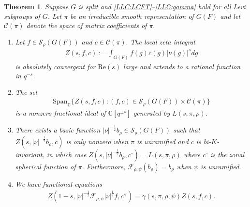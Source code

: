 \documentclass[10pt]{amsart}
\newtheorem{theorem}{Theorem}[section]
\theoremstyle{definition}
\numberwithin{equation}{section}
\numberwithin{equation}{subsection}
\begin{document}
\begin{theorem}\label{BKN:conj} Suppose $G$ is split and \eqref{LLC:LCFT}--\eqref{LLC:gamma} hold for all Levi subgroups of $G$. Let $\pi$ be an irreducible smooth representation of $G(F)$ and let $\mathcal{C}(\pi)$ denote the space of matrix coefficients of $\pi.$
\begin{enumerate}
    \item\label{BKN:zeta} Let $f\in\mathcal{S}_\rho(G(F))$ and $c\in\mathcal{C}(\pi).$ The local zeta integral
    \begin{align*}
        Z(s,f,c) := \int_{G(F)} f(g)c(g)|\nu(g)|^s dg
    \end{align*}
    is absolutely convergent for $\mathrm{Re}(s)$ large and extends to a rational function in $q^{-s}$.
    \item\label{BKN:span:L} The set
    \begin{align*}
        \mathrm{Span}_{\mathbb{C}}\{Z(s,f,c):(f,c)\in\mathcal{S}_\rho(G(F))\times\mathcal{C}(\pi)\}
    \end{align*}
    is a nonzero fractional ideal of $\mathbb{C}[q^{\pm s}]$ generated by $L(s,\pi,\rho)$.
    \item\label{BKN:basic} There exists a basic function $|\nu|^{-\frac{1}{2}}b_\rho\in\mathcal{S}_\rho(G(F))$ such that $Z(s,|\nu|^{-\frac{1}{2}}b_\rho,c)$ is only nonzero when $\pi$ is unramified and $c$ is bi-$K$-invariant, in which case $Z(s,|\nu|^{-\frac{1}{2}}b_\rho,c^\circ) = L(s,\pi,\rho)$ where $c^\circ$ is the zonal spherical function of $\pi$. Furthermore, $\mathcal{F}_{\rho,\psi}(b_\rho) = b_\rho$ when $\psi$ is unramified.
       
    \item\label{BKN:FT}  We have functional equations
        \begin{align*}
        Z(1-s,|\nu|^{-\frac{1}{2}}\mathcal{F}_{\rho,\psi}|\nu|^{\frac{1}{2}} f,c^\vee) = \gamma(s,\pi,\rho,\psi)Z(s,f,c).
        \end{align*}
\end{enumerate}
\end{theorem}
\end{document}
